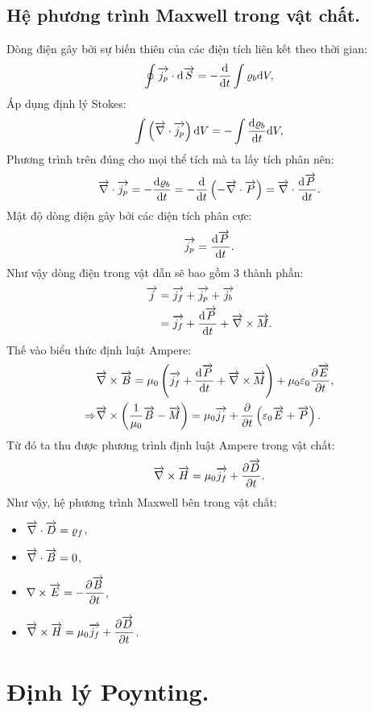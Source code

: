 \begin{appendices}
\subsection{Hệ phương trình Maxwell trong vật chất.}
Dòng điện gây bởi sự biến thiên của các điện tích liên kết theo thời gian:
	$$\oint\overrightarrow{j_p}\cdot\mathrm{d}\overrightarrow{S}=-\dfrac{\mathrm{d} }{\mathrm{d} t}\int\varrho_b\mathrm{d} V,$$
Áp dụng định lý Stokes:
	$$\int\left(\overrightarrow{\nabla}\cdot\overrightarrow{j_p}\right)\mathrm{d} V=-\int\dfrac{\mathrm{d}\varrho_b }{\mathrm{d} t}\mathrm{d} V,$$
Phương trình trên đúng cho mọi thể tích mà ta lấy tích phân nên:	
	$$\overrightarrow{\nabla}\cdot\overrightarrow{j_p}=-\dfrac{\mathrm{d}\varrho_b }{\mathrm{d} t}=-\dfrac{\mathrm{d} }{\mathrm{d} t}\left(-\overrightarrow{\nabla}\cdot\overrightarrow{P}\right)=\overrightarrow{\nabla}\cdot\dfrac{\mathrm{d} \overrightarrow{P}}{\mathrm{d} t}.$$
Mật độ dòng điện gây bởi các điện tích phân cực:	
	$$\overrightarrow{j_p}=\dfrac{\mathrm{d} \overrightarrow{P}}{\mathrm{d} t}.$$
Như vậy dòng điện trong vật dẫn sẽ bao gồm 3 thành phần:
	\begin{align*}
	\overrightarrow{j}&=\overrightarrow{j_f}+\overrightarrow{j_p}+\overrightarrow{j_b}\\
	&=\overrightarrow{j_f}+\dfrac{\mathrm{d} \overrightarrow{P}}{\mathrm{d} t}+\overrightarrow{\nabla}\times\overrightarrow{M}.
	\end{align*}
	Thế vào biểu thức định luật Ampere:
	\begin{align*}
	&\overrightarrow{\nabla}\times\overrightarrow{B}= \mu_0\left(\overrightarrow{j_f}+\dfrac{\mathrm{d} \overrightarrow{P}}{\mathrm{d} t}+\overrightarrow{\nabla}\times\overrightarrow{M}\right)+\mu_0\varepsilon_0\dfrac{\partial \overrightarrow{E}}{\partial t},\\
	\Rightarrow&\overrightarrow{\nabla}\times\left(\dfrac{1}{\mu_0}\overrightarrow{B}-\overrightarrow{M}\right)=\mu_0\overrightarrow{j_f}+\dfrac{\partial}{\partial t}\left(\varepsilon_0\overrightarrow{E}+\overrightarrow{P}\right).
	\end{align*}
	Từ đó ta thu được phương trình định luật Ampere trong vật chất:
	$$\overrightarrow{\nabla}\times\overrightarrow{H}=\mu_0\overrightarrow{j_f}+\dfrac{\partial\overrightarrow{D}}{\partial t}.$$
	Như vậy, hệ phương trình Maxwell bên trong vật chất:
	\begin{itemize}
		\item $\overrightarrow{\nabla}\cdot\overrightarrow{D}=\varrho_f $,
		\item $\overrightarrow{\nabla}\cdot\overrightarrow{B}=0$,
		\item $\nabla \times \overrightarrow{E}= - \dfrac{\partial \overrightarrow{B}}{\partial t}$,
		\item $\overrightarrow{\nabla}\times\overrightarrow{H}= \mu_0\overrightarrow{j_f}+\dfrac{\partial \overrightarrow{D}}{\partial t}$.
	\end{itemize}

\section{Định lý Poynting.}

\end{appendices}
